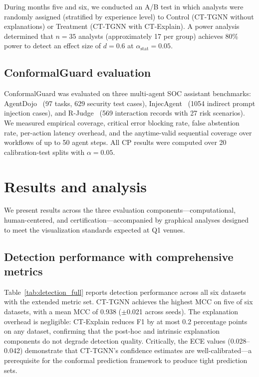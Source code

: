 \documentclass[preprint,review,12pt]{elsarticle}
\begin{document}
During months five and six, we conducted an A/B test in which analysts were randomly assigned (stratified by experience level) to Control (CT-TGNN without explanations) or Treatment (CT-TGNN with CT-Explain). A power analysis determined that $n = 35$ analysts (approximately 17 per group) achieves 80\% power to detect an effect size of $d = 0.6$ at $\alpha_{\mathrm{stat}} = 0.05$.

\subsection{ConformalGuard evaluation}

ConformalGuard was evaluated on three multi-agent SOC assistant benchmarks: AgentDojo~\cite{agentdojo_2024} (97 tasks, 629 security test cases), InjecAgent~\cite{injecagent_2024} (1054 indirect prompt injection cases), and R-Judge~\cite{rjudge_2024} (569 interaction records with 27 risk scenarios). We measured empirical coverage, critical error blocking rate, false abstention rate, per-action latency overhead, and the anytime-valid sequential coverage over workflows of up to 50 agent steps. All CP results were computed over 20 calibration-test splits with $\alpha = 0.05$.


\section{Results and analysis}
\label{sec:results}

We present results across the three evaluation components---computational, human-centered, and certification---accompanied by graphical analyses designed to meet the visualization standards expected at Q1 venues.

\subsection{Detection performance with comprehensive metrics}

Table~\ref{tab:detection_full} reports detection performance across all six datasets with the extended metric set. CT-TGNN achieves the highest MCC on five of six datasets, with a mean MCC of 0.938 ($\pm$0.021 across seeds). The explanation overhead is negligible: CT-Explain reduces F1 by at most 0.2 percentage points on any dataset, confirming that the post-hoc and intrinsic explanation components do not degrade detection quality. Critically, the ECE values (0.028--0.042) demonstrate that CT-TGNN's confidence estimates are well-calibrated---a prerequisite for the conformal prediction framework to produce tight prediction sets.
\end{document}
